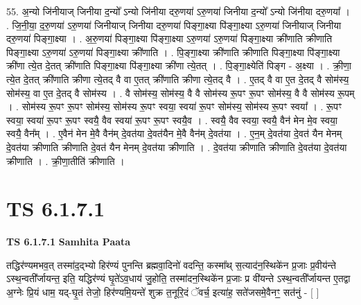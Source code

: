 \documentclass[17pt]{extarticle}
\begin{document}
55. अ॒न्यो जि॑नीयाज् जिनीया द॒न्यो᳚ ऽन्यो जि॑नीया दरु॒णया॑ ऽरु॒णया॑ जिनीया द॒न्यो᳚ ऽन्यो जि॑नीया दरु॒णया᳚ । . जि॒नी॒या॒ द॒रु॒णया॑ ऽरु॒णया॑ जिनीयाज् जिनीया दरु॒णया॑ पिङ्गा॒क्ष्या पि॑ङ्गा॒क्ष्या ऽरु॒णया॑ जिनीयाज् जिनीया दरु॒णया॑ पिङ्गा॒क्ष्या । . अ॒रु॒णया॑ पिङ्गा॒क्ष्या पि॑ङ्गा॒क्ष्या ऽरु॒णया॑ ऽरु॒णया॑ पिङ्गा॒क्ष्या क्री॑णाति क्रीणाति पिङ्गा॒क्ष्या ऽरु॒णया॑ ऽरु॒णया॑ पिङ्गा॒क्ष्या क्री॑णाति । . पि॒ङ्गा॒क्ष्या क्री॑णाति क्रीणाति पिङ्गा॒क्ष्या पि॑ङ्गा॒क्ष्या क्री॑णा त्ये॒त दे॒तत् क्री॑णाति पिङ्गा॒क्ष्या पि॑ङ्गा॒क्ष्या क्री॑णा त्ये॒तत् । . पि॒ङ्गा॒क्ष्येति॑ पिङ्ग - अ॒क्ष्या । . क्री॒णा॒ त्ये॒त दे॒तत् क्री॑णाति क्रीणा त्ये॒तद् वै वा ए॒तत् क्री॑णाति क्रीणा त्ये॒तद् वै । . ए॒तद् वै वा ए॒त दे॒तद् वै सोम॑स्य॒ सोम॑स्य॒ वा ए॒त दे॒तद् वै सोम॑स्य । . वै सोम॑स्य॒ सोम॑स्य॒ वै वै सोम॑स्य रू॒पꣳ रू॒पꣳ सोम॑स्य॒ वै वै सोम॑स्य रू॒पम् । . सोम॑स्य रू॒पꣳ रू॒पꣳ सोम॑स्य॒ सोम॑स्य रू॒पꣳ स्वया॒ स्वया॑ रू॒पꣳ सोम॑स्य॒ सोम॑स्य रू॒पꣳ स्वया᳚ । . रू॒पꣳ स्वया॒ स्वया॑ रू॒पꣳ रू॒पꣳ स्वयै॒ वैव स्वया॑ रू॒पꣳ रू॒पꣳ स्वयै॒व । . स्वयै॒ वैव स्वया॒ स्वयै॒ वैन॑ मेन मे॒व स्वया॒ स्वयै॒ वैन᳚म् । . ए॒वैन॑ मेन मे॒वै वैन॑म् दे॒वत॑या दे॒वत॑यैन मे॒वै वैन॑म् दे॒वत॑या । . ए॒न॒म् दे॒वत॑या दे॒वत॑ यैन मेनम् दे॒वत॑या क्रीणाति क्रीणाति दे॒वत॑ यैन मेनम् दे॒वत॑या क्रीणाति । . दे॒वत॑या क्रीणाति क्रीणाति दे॒वत॑या दे॒वत॑या क्रीणाति । . क्री॒णा॒तीति॑ क्रीणाति । \newline
\pagebreak
{}

\section{ TS 6.1.7.1 }

\textbf{TS 6.1.7.1 } \newline
\textbf{Samhita Paata} \newline

तद्धिर॑ण्यमभव॒त् तस्मा॑द॒द्भ्यो हिर॑ण्यं पुनन्ति ब्रह्मवा॒दिनो॑ वदन्ति॒ कस्मा᳚थ् स॒त्याद॑न॒स्थिके॑न प्र॒जाः प्र॒वीय॑न्ते ऽस्थ॒न्वती᳚र्जायन्त॒ इति॒ यद्धिर॑ण्यं घृ॒ते॑ऽव॒धाय॑ जु॒होति॒ तस्मा॑दन॒स्थिके॑न प्र॒जाः प्र वी॑यन्ते ऽस्थ॒न्वती᳚र्जायन्त ए॒तद्वा अ॒ग्नेः प्रि॒यं धाम॒ यद्-घृ॒तं तेजो॒ हिर॑ण्यमि॒यन्ते॑ शुक्र त॒नूरि॒दं ॅवर्च॒ इत्या॑ह॒ सते॑जसमे॒वैनꣳ॒॒ सत॑नुं - [  ] \newline
\end{document}
